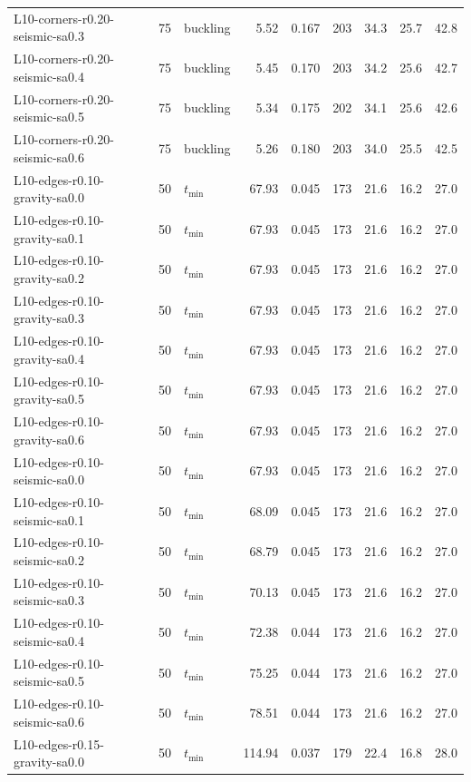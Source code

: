\begin{tabular}{lrlrrrrrr}
L10-corners-r0.20-seismic-sa0.3 & 75 & buckling & 5.52 & 0.167 & 203 & 34.3 & 25.7 & 42.8 \\
L10-corners-r0.20-seismic-sa0.4 & 75 & buckling & 5.45 & 0.170 & 203 & 34.2 & 25.6 & 42.7 \\
L10-corners-r0.20-seismic-sa0.5 & 75 & buckling & 5.34 & 0.175 & 202 & 34.1 & 25.6 & 42.6 \\
L10-corners-r0.20-seismic-sa0.6 & 75 & buckling & 5.26 & 0.180 & 203 & 34.0 & 25.5 & 42.5 \\
L10-edges-r0.10-gravity-sa0.0 & 50 & $t_{\mathrm{min}}$ & 67.93 & 0.045 & 173 & 21.6 & 16.2 & 27.0 \\
L10-edges-r0.10-gravity-sa0.1 & 50 & $t_{\mathrm{min}}$ & 67.93 & 0.045 & 173 & 21.6 & 16.2 & 27.0 \\
L10-edges-r0.10-gravity-sa0.2 & 50 & $t_{\mathrm{min}}$ & 67.93 & 0.045 & 173 & 21.6 & 16.2 & 27.0 \\
L10-edges-r0.10-gravity-sa0.3 & 50 & $t_{\mathrm{min}}$ & 67.93 & 0.045 & 173 & 21.6 & 16.2 & 27.0 \\
L10-edges-r0.10-gravity-sa0.4 & 50 & $t_{\mathrm{min}}$ & 67.93 & 0.045 & 173 & 21.6 & 16.2 & 27.0 \\
L10-edges-r0.10-gravity-sa0.5 & 50 & $t_{\mathrm{min}}$ & 67.93 & 0.045 & 173 & 21.6 & 16.2 & 27.0 \\
L10-edges-r0.10-gravity-sa0.6 & 50 & $t_{\mathrm{min}}$ & 67.93 & 0.045 & 173 & 21.6 & 16.2 & 27.0 \\
L10-edges-r0.10-seismic-sa0.0 & 50 & $t_{\mathrm{min}}$ & 67.93 & 0.045 & 173 & 21.6 & 16.2 & 27.0 \\
L10-edges-r0.10-seismic-sa0.1 & 50 & $t_{\mathrm{min}}$ & 68.09 & 0.045 & 173 & 21.6 & 16.2 & 27.0 \\
L10-edges-r0.10-seismic-sa0.2 & 50 & $t_{\mathrm{min}}$ & 68.79 & 0.045 & 173 & 21.6 & 16.2 & 27.0 \\
L10-edges-r0.10-seismic-sa0.3 & 50 & $t_{\mathrm{min}}$ & 70.13 & 0.045 & 173 & 21.6 & 16.2 & 27.0 \\
L10-edges-r0.10-seismic-sa0.4 & 50 & $t_{\mathrm{min}}$ & 72.38 & 0.044 & 173 & 21.6 & 16.2 & 27.0 \\
L10-edges-r0.10-seismic-sa0.5 & 50 & $t_{\mathrm{min}}$ & 75.25 & 0.044 & 173 & 21.6 & 16.2 & 27.0 \\
L10-edges-r0.10-seismic-sa0.6 & 50 & $t_{\mathrm{min}}$ & 78.51 & 0.044 & 173 & 21.6 & 16.2 & 27.0 \\
L10-edges-r0.15-gravity-sa0.0 & 50 & $t_{\mathrm{min}}$ & 114.94 & 0.037 & 179 & 22.4 & 16.8 & 28.0 \\

\end{tabular}
